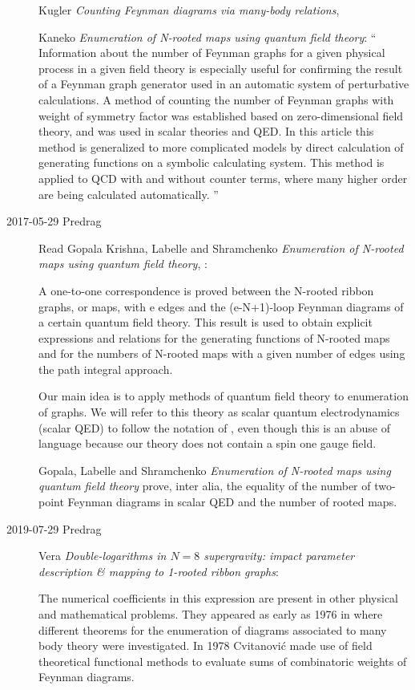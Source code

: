 \begin{description}
Kugler
{\em Counting {Feynman} diagrams via many-body relations},

Kaneko
{\em Enumeration of {N}-rooted maps using quantum field theory}: ``
Information about the number of Feynman graphs for a given physical
process in a given field theory is especially useful for confirming the
result of a Feynman graph generator used in an automatic system of
perturbative calculations. A method of counting the number of Feynman
graphs with weight of symmetry factor was established based on
zero-dimensional field theory, and was used in scalar theories and QED.
In this article this method is generalized to more complicated models by
direct calculation of generating functions on a symbolic calculating
system. This method is applied to QCD with and without counter terms,
where many higher order are being calculated automatically.
''

\item[2017-05-29 Predrag] Read
 Gopala Krishna, Labelle  and Shramchenko
{\em Enumeration of {N}-rooted maps using quantum field theory},
:

A one-to-one correspondence is proved between the N-rooted ribbon graphs,
or maps, with e edges and the (e-N+1)-loop Feynman diagrams of a certain
quantum field theory. This result is used to obtain explicit expressions
and relations for the generating functions of N-rooted maps and for the
numbers of N-rooted maps with a given number of edges using the path
integral approach.

Our main idea is to apply methods of quantum field theory to enumeration
of graphs. We will refer to this theory as scalar quantum electrodynamics
(scalar QED) to follow the notation of , even though
this is an abuse of language because our theory does not contain a spin
one gauge field.

Gopala, Labelle and Shramchenko {\em Enumeration of
{N}-rooted maps using quantum field theory} prove, inter alia, the
equality of the number of two-point Feynman diagrams in scalar
QED and the number of rooted maps.

\item[2019-07-29 Predrag]
Vera {\em Double-logarithms in {$N= 8$} supergravity: impact
parameter description {\&} mapping to 1-rooted ribbon graphs}:

The numerical coefficients in this expression are present in other
physical and mathematical problems.  They appeared as early as 1976 in
 where different theorems for the enumeration of diagrams
associated to many body theory were investigated.  In 1978 Cvitanovi\'c
\etal{} made use  of field  theoretical  functional  methods
to  evaluate  sums  of combinatoric weights of Feynman diagrams.


\end{description}
